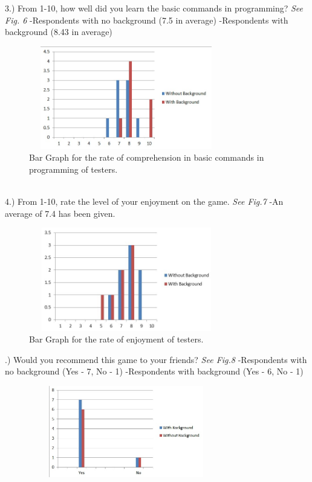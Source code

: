 \documentclass[journal]{./IEEE/IEEEtran}
\begin{document}
\begin{justify}
3.) From 1-10, how well did you learn the basic commands in programming? \textit{See Fig. 6}\newline
-Respondents with no background (7.5 in average)\newline
-Respondents with background (8.43 in average) \newline
\begin{figure}[ht]
   \includegraphics[width = 8.5cm,height = 4.5cm]{images/bargraph}
   \caption{Bar Graph for the rate of comprehension in basic commands in programming of testers.}
   \label{1}
\end{figure}
\\
4.) From 1-10, rate the level of your enjoyment on the game. \textit{See Fig.7} \newline
-An average of 7.4 has been given. \newline
\begin{figure}[ht]
   \includegraphics[width = 8.5cm,height = 4.5cm]{images/bargraph2}
   \caption{Bar Graph for the rate of enjoyment of testers.}
   \label{2}
\end{figure}
.) Would you recommend this game to your friends? \textit{See Fig.8} \newline
-Respondents with no background (Yes - 7, No - 1) \newline
-Respondents with background (Yes - 6, No - 1)\newline
\begin{figure}[ht]
   \includegraphics[width = 8.5cm,height = 4cm]{images/bargraph3}

\end{figure}
\end{justify}
\end{document}

